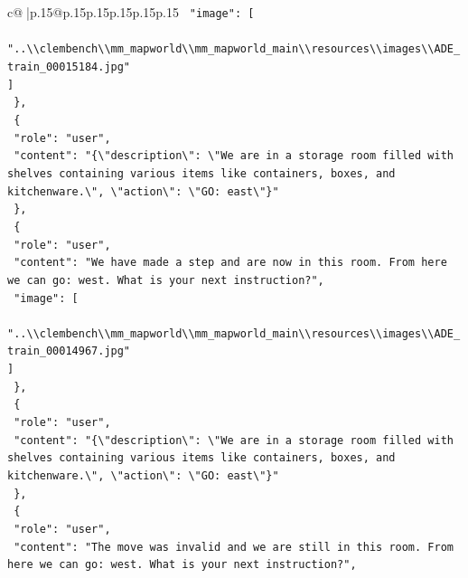 \documentclass{article}
\begin{document}
{\begin{supertabular}{c@{$\;$}|p{.15\linewidth}@{}p{.15\linewidth}p{.15\linewidth}p{.15\linewidth}p{.15\linewidth}p{.15\linewidth}}
{{{\texttt{    "image": {[}} \\
\texttt{      "..\textbackslash{}\textbackslash{}clembench\textbackslash{}\textbackslash{}mm\_mapworld\textbackslash{}\textbackslash{}mm\_mapworld\_main\textbackslash{}\textbackslash{}resources\textbackslash{}\textbackslash{}images\textbackslash{}\textbackslash{}ADE\_train\_00015184.jpg"} \\
\texttt{    {]}} \\
\texttt{  \},} \\
\texttt{  \{} \\
\texttt{    "role": "user",} \\
\texttt{    "content": "\{\textbackslash{}"description\textbackslash{}": \textbackslash{}"We are in a storage room filled with shelves containing various items like containers, boxes, and kitchenware.\textbackslash{}", \textbackslash{}"action\textbackslash{}": \textbackslash{}"GO: east\textbackslash{}"\}"} \\
\texttt{  \},} \\
\texttt{  \{} \\
\texttt{    "role": "user",} \\
\texttt{    "content": "We have made a step and are now in this room. From here we can go: west. What is your next instruction?",} \\
\texttt{    "image": {[}} \\
\texttt{      "..\textbackslash{}\textbackslash{}clembench\textbackslash{}\textbackslash{}mm\_mapworld\textbackslash{}\textbackslash{}mm\_mapworld\_main\textbackslash{}\textbackslash{}resources\textbackslash{}\textbackslash{}images\textbackslash{}\textbackslash{}ADE\_train\_00014967.jpg"} \\
\texttt{    {]}} \\
\texttt{  \},} \\
\texttt{  \{} \\
\texttt{    "role": "user",} \\
\texttt{    "content": "\{\textbackslash{}"description\textbackslash{}": \textbackslash{}"We are in a storage room filled with shelves containing various items like containers, boxes, and kitchenware.\textbackslash{}", \textbackslash{}"action\textbackslash{}": \textbackslash{}"GO: east\textbackslash{}"\}"} \\
\texttt{  \},} \\
\texttt{  \{} \\
\texttt{    "role": "user",} \\
\texttt{    "content": "The move was invalid and we are still in this room. From here we can go: west. What is your next instruction?",} \\
}}}
\end{supertabular}}
\end{document}
